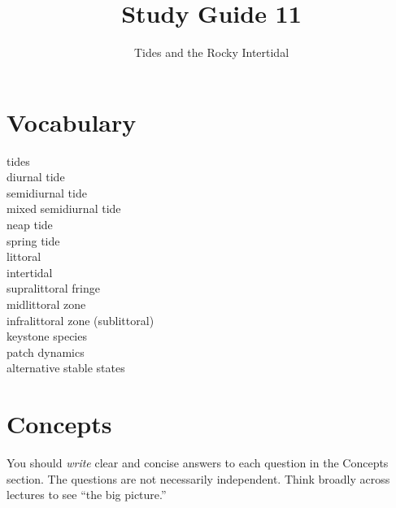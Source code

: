 \documentclass[nofonts, letterpaper]{tufte-handout}
\title{Study Guide 11}%
\author{Tides and the Rocky Intertidal}
\date{} %
\begin{document}
\maketitle	%


\section{Vocabulary}
\vspace{-1\baselineskip}
\begin{multicols}{2}
tides\\
diurnal tide\\
semidiurnal tide\\
mixed semidiurnal tide\\
neap tide\\
spring tide\\
littoral \\
intertidal \\
supralittoral fringe\\
midlittoral zone\\
infralittoral zone (sublittoral)\\
keystone species \\
patch dynamics \\
alternative stable states
\end{multicols}

\section{Concepts}

You should \emph{write} clear and concise answers to each question in the Concepts section.  The questions are not necessarily independent.  Think broadly across lectures to see ``the big picture.'' 
\end{document}
